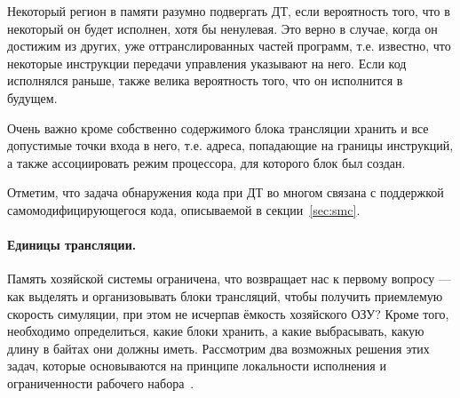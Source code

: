 \begin{itemize*}
    \item Некоторый регион в памяти разумно подвергать ДТ, если вероятность того, что в некоторый он будет исполнен, хотя бы ненулевая. Это верно в случае, когда он достижим из других, уже оттранслированных частей программ, т.е. известно, что некоторые инструкции передачи управления указывают на него. Если код исполнялся раньше, также велика вероятность того, что он исполнится в будущем.
    \item Очень важно кроме собственно содержимого блока трансляции хранить и все допустимые точки входа в него, т.е. адреса, попадающие на границы инструкций, а также ассоциировать режим процессора, для которого блок был создан.
\end{itemize*}

Отметим, что задача обнаружения кода при ДТ во многом связана с поддержкой самомодифицирующегося кода, описываемой в секции~\ref{sec:smc}.

\paragraph{Единицы трансляции.} Память хозяйской системы ограничена, что возвращает нас к первому вопросу --- как выделять и организовывать блоки трансляций, чтобы  получить приемлемую скорость симуляции, при этом не исчерпав ёмкость хозяйского ОЗУ? Кроме того, необходимо определиться, какие блоки хранить, а какие выбрасывать, какую длину в байтах они должны иметь. Рассмотрим два возможных решения этих задач, которые основываются на принципе локальности исполнения и ограниченности рабочего набора~\cite{DBLP:books/daglib/0013597}.
 
